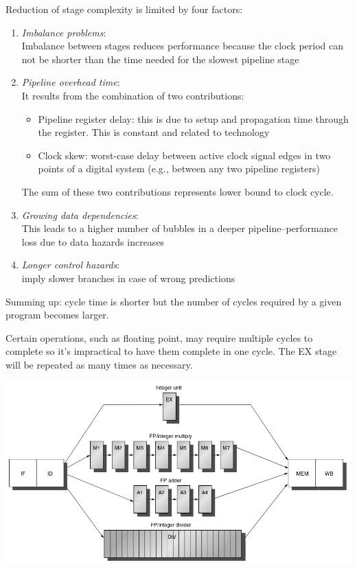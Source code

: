 Reduction of stage complexity is limited by four factors:
\begin{enumerate}
    \item \textit{Imbalance problems}:\\
    Imbalance between stages reduces performance because the clock period can not be shorter than the time needed for the slowest pipeline stage
    \item \textit{Pipeline overhead time}:\\
    It results from the combination of two contributions:
    \begin{itemize}
        \item Pipeline register delay: this is due to setup and propagation time through the register. This is constant and related to technology 
        \item Clock skew: worst-case delay between active clock signal edges in two points of a digital system (e.g., between any two pipeline registers)
    \end{itemize}
    The sum of these two contributions represents lower bound to clock cycle.
    \item \textit{Growing data dependencies}:\\
    This leads to a higher number of bubbles in a deeper pipeline–performance loss due to data hazards increases
    \item \textit{Longer control hazards}:\\
    imply slower branches in case of wrong predictions
\end{enumerate}

Summing up: cycle time is shorter but the number of cycles required by a given program becomes larger.

Certain operations, such as floating point, may require multiple cycles to complete so it's impractical to have them complete in one cycle.
The EX stage will be repeated as many times as necessary.

\includegraphics[width=\textwidth]{images/superpipeline.png}

